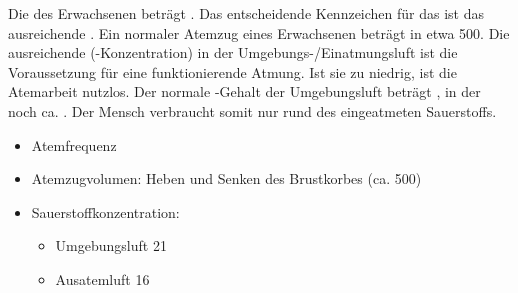 {
Die  des Erwachsenen beträgt
.
Das entscheidende Kennzeichen für das  ist das 
ausreichende . 
Ein normaler Atemzug eines Erwachsenen beträgt in etwa 500\Ml*.
Die ausreichende  (-Konzentration) 
in der Umgebungs-/Einatmungsluft ist die
Voraussetzung für eine funktionierende Atmung. 
Ist sie zu niedrig, ist die  Atemarbeit nutzlos. 
Der normale -Gehalt der Umgebungsluft beträgt
\E{21\PC*}, in der  
noch ca. \E{16\PC*}. 
Der Mensch verbraucht somit nur rund  des
eingeatmeten Sauerstoffs. \cite{Silbernagl3-Atmung}
}{
\begin{itemize}
  \item Atemfrequenz \PerMin*
  \item Atemzugvolumen: Heben und Senken des Brustkorbes 
  (ca. 500\Ml*)
  \item Sauerstoffkonzentration:
  \begin{itemize}
    \item Umgebungsluft 21\PC* 
    \item Ausatemluft 16\PC* 
  \end{itemize}
\end{itemize}
}{}{}{}



